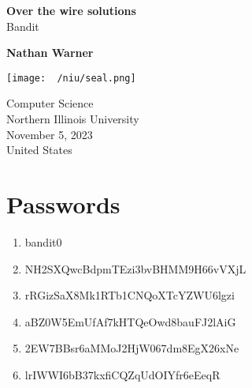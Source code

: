 \documentclass{report}
\title{\Huge{}}
\author{\huge{Nathan Warner}}
\date{\huge{}}
\begin{document}
        \begin{titlepage}
       \begin{center}
           \vspace*{1cm}
    
           \textbf{Over the wire solutions} \\
           Bandit
    
           \vspace{0.5cm}
            
                
           \vspace{1.5cm}
    
           \textbf{Nathan Warner}
    
           \vfill
                
                
           \vspace{0.8cm}
         
           \texttt{[image: ~/niu/seal.png]}
                
           Computer Science \\
           Northern Illinois University\\
           November 5, 2023 \\
           United States\\
           
                
       \end{center}
    \end{titlepage}
    \tableofcontents
    \pagebreak 
    \section*{Passwords}
    \begin{enumerate}[start=0]
        \item bandit0
        \item NH2SXQwcBdpmTEzi3bvBHMM9H66vVXjL
        \item rRGizSaX8Mk1RTb1CNQoXTcYZWU6lgzi
        \item aBZ0W5EmUfAf7kHTQeOwd8bauFJ2lAiG
        \item 2EW7BBsr6aMMoJ2HjW067dm8EgX26xNe
        \item lrIWWI6bB37kxfiCQZqUdOIYfr6eEeqR
    \end{enumerate}
\end{document}
